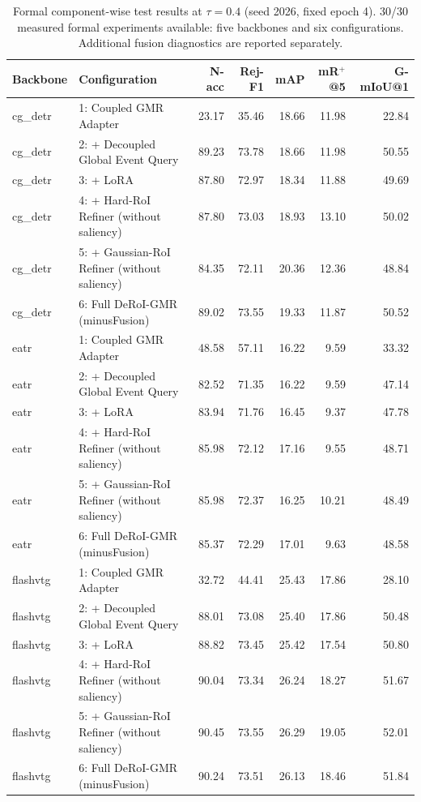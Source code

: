 \begin{table}[t]
\centering
\small
\caption{Formal component-wise test results at $\tau=0.4$ (seed 2026, fixed epoch 4). 30/30 measured formal experiments available: five backbones and six configurations. Additional fusion diagnostics are reported separately.}
\begin{tabular}{llrrrrr}
\hline
Backbone & Configuration & N-acc & Rej-F1 & mAP & mR$^+$@5 & G-mIoU@1 \\
\hline
cg\_detr & 1: Coupled GMR Adapter & 23.17 & 35.46 & 18.66 & 11.98 & 22.84 \\
cg\_detr & 2: + Decoupled Global Event Query & 89.23 & 73.78 & 18.66 & 11.98 & 50.55 \\
cg\_detr & 3: + LoRA & 87.80 & 72.97 & 18.34 & 11.88 & 49.69 \\
cg\_detr & 4: + Hard-RoI Refiner (without saliency) & 87.80 & 73.03 & 18.93 & 13.10 & 50.02 \\
cg\_detr & 5: + Gaussian-RoI Refiner (without saliency) & 84.35 & 72.11 & 20.36 & 12.36 & 48.84 \\
cg\_detr & 6: Full DeRoI-GMR (minusFusion) & 89.02 & 73.55 & 19.33 & 11.87 & 50.52 \\
eatr & 1: Coupled GMR Adapter & 48.58 & 57.11 & 16.22 & 9.59 & 33.32 \\
eatr & 2: + Decoupled Global Event Query & 82.52 & 71.35 & 16.22 & 9.59 & 47.14 \\
eatr & 3: + LoRA & 83.94 & 71.76 & 16.45 & 9.37 & 47.78 \\
eatr & 4: + Hard-RoI Refiner (without saliency) & 85.98 & 72.12 & 17.16 & 9.55 & 48.71 \\
eatr & 5: + Gaussian-RoI Refiner (without saliency) & 85.98 & 72.37 & 16.25 & 10.21 & 48.49 \\
eatr & 6: Full DeRoI-GMR (minusFusion) & 85.37 & 72.29 & 17.01 & 9.63 & 48.58 \\
flashvtg & 1: Coupled GMR Adapter & 32.72 & 44.41 & 25.43 & 17.86 & 28.10 \\
flashvtg & 2: + Decoupled Global Event Query & 88.01 & 73.08 & 25.40 & 17.86 & 50.48 \\
flashvtg & 3: + LoRA & 88.82 & 73.45 & 25.42 & 17.54 & 50.80 \\
flashvtg & 4: + Hard-RoI Refiner (without saliency) & 90.04 & 73.34 & 26.24 & 18.27 & 51.67 \\
flashvtg & 5: + Gaussian-RoI Refiner (without saliency) & 90.45 & 73.55 & 26.29 & 19.05 & 52.01 \\
flashvtg & 6: Full DeRoI-GMR (minusFusion) & 90.24 & 73.51 & 26.13 & 18.46 & 51.84 \\

\end{tabular}
\end{table}
